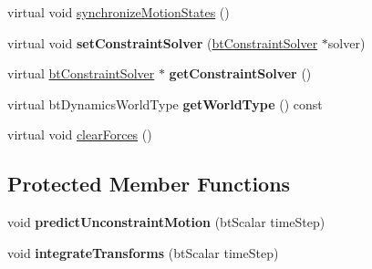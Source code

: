 \begin{DoxyCompactItemize}
\item 
virtual void \hyperlink{classbt_simple_dynamics_world_a91e996f5ce6e465e805565ee0ba14824}{synchronize\+Motion\+States} ()
\item 
\hypertarget{classbt_simple_dynamics_world_a8b198b5865f73a01f4c7deee69e0999c}{virtual void {\bfseries set\+Constraint\+Solver} (\hyperlink{classbt_constraint_solver}{bt\+Constraint\+Solver} $\ast$solver)}\label{classbt_simple_dynamics_world_a8b198b5865f73a01f4c7deee69e0999c}

\item 
\hypertarget{classbt_simple_dynamics_world_a605b993d42c54a5aff9c8e39063031d8}{virtual \hyperlink{classbt_constraint_solver}{bt\+Constraint\+Solver} $\ast$ {\bfseries get\+Constraint\+Solver} ()}\label{classbt_simple_dynamics_world_a605b993d42c54a5aff9c8e39063031d8}

\item 
\hypertarget{classbt_simple_dynamics_world_a69cf414081d40a56fe691e3ea94d9cba}{virtual bt\+Dynamics\+World\+Type {\bfseries get\+World\+Type} () const }\label{classbt_simple_dynamics_world_a69cf414081d40a56fe691e3ea94d9cba}

\item 
virtual void \hyperlink{classbt_simple_dynamics_world_ac44c80444f4d6d4e3c2955dd43b7a93a}{clear\+Forces} ()
\end{DoxyCompactItemize}
\subsection*{Protected Member Functions}
\begin{DoxyCompactItemize}
\item 
\hypertarget{classbt_simple_dynamics_world_ace01d5de5f2772b7e72fddf3a240b38a}{void {\bfseries predict\+Unconstraint\+Motion} (bt\+Scalar time\+Step)}\label{classbt_simple_dynamics_world_ace01d5de5f2772b7e72fddf3a240b38a}

\item 
\hypertarget{classbt_simple_dynamics_world_a9ff7980b0472d3ed5dadc5798d696b7d}{void {\bfseries integrate\+Transforms} (bt\+Scalar time\+Step)}\label{classbt_simple_dynamics_world_a9ff7980b0472d3ed5dadc5798d696b7d}

\end{DoxyCompactItemize}
